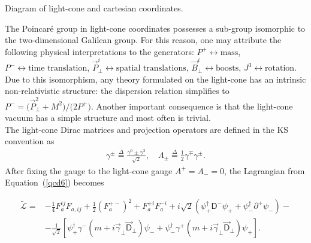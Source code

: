 \begin{marginfigure}[-5.5cm]
	\centering
    
    \caption*{Diagram of light-cone and cartesian coordinates.}
\end{marginfigure}

The Poincar\'e group in light-cone coordinates possesses a sub-group isomorphic to the two-dimensional Galilean group. For this reason, one may attribute the following physical interpretations \cite{venugopalanlc} to the generators: $P^+\leftrightarrow\text{mass}$, $P^-\leftrightarrow\text{time translation}$, $\vec{P}_\perp^i\leftrightarrow\text{spatial translations}$, $\vec{B}_\perp^i\leftrightarrow\text{boosts}$, $J^3\leftrightarrow\text{rotation}$. \\
Due to this isomorphism, any theory formulated on the light-cone has an intrinsic non-relativistic structure: the dispersion relation simplifies to $P^-=\big(\vec{P}_\perp^2+M^2\big)/\big(2P^+\big)$. Another important consequence is that the light-cone vacuum has a simple structure and most often is trivial. \\
The light-cone Dirac matrices and projection operators are defined in the KS convention as
\begin{align*}
\gamma^\pm\overset{\Delta}{=}\frac{\gamma^0\pm\gamma^3}{\sqrt{2}}, \quad \Lambda_\pm\overset{\Delta}{=}\frac{1}{2}\gamma^\mp\gamma^\pm.
\end{align*}
After fixing the gauge to the {\sffamily\color{ming} light-cone gauge} $A^+=A_-=0$, the Lagrangian from Equation~(\cref{qcd6}) becomes
\vspace{0.3cm}
\begin{fullwidth}
\begin{align*}
    \widetilde{\mathcal{L}}=&-\frac{1}{4}F^{ij}_aF_{a,ij}+\frac{1}{2}\left(F^{+-}_a\right)^2+F_a^{+i}F_a^{-i}+i\sqrt{2}\left(\psi_+^\dag\textsf{D}^-\psi_++\psi_-^\dag\partial^+\psi_-\right)-\\
&-\frac{1}{\sqrt{2}}\left[\psi_+^\dag\gamma^-\left(m+i\vec{\gamma}_\perp\vec{\textsf{D}}_\perp\right)\psi_-+\psi_-^\dag\gamma^+\left(m+i\vec{\gamma}_\perp\vec{\textsf{D}}_\perp\right)\psi_+\right].
\end{align*}
\end{fullwidth}
